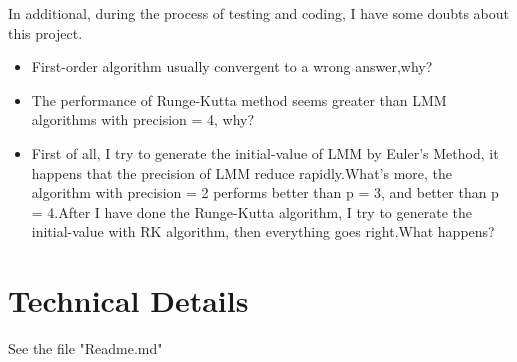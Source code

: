 \documentclass[UTF8]{ctexart}
\theoremstyle{plain}
\theoremstyle{definition}
\theoremstyle{remark}
\begin{document}
In additional, during the process of testing and coding, I have some doubts about this project.
\begin{itemize}
\item First-order algorithm usually convergent to a wrong answer,why?
\item The performance of Runge-Kutta method seems greater than LMM algorithms with precision = 4, why?
\item First of all, I try to generate the initial-value of LMM by Euler's Method, it happens that the precision of LMM reduce rapidly.What's more, the algorithm with precision = 2 performs better than p = 3, and better than p = 4.After I have done the Runge-Kutta algorithm, I try to generate the initial-value with RK algorithm, then everything goes right.What happens?
\end{itemize}
\section{Technical Details}
See the file "Readme.md"
\end{document}
